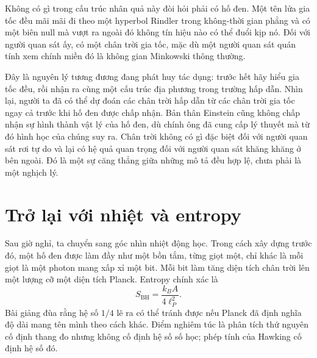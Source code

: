 Không có gì trong cấu trúc nhân quả này đòi hỏi phải có hố đen. Một tên lửa gia tốc đều mãi mãi đi theo một hyperbol Rindler trong không-thời gian phẳng và có một biên null mà vượt ra ngoài đó không tín hiệu nào có thể đuổi kịp nó. Đối với người quan sát ấy, có một chân trời gia tốc, mặc dù một người quan sát quán tính xem chính miền đó là không gian Minkowski thông thường.

\begin{classroomqa}
\end{classroomqa}

Đây là nguyên lý tương đương đang phát huy tác dụng: trước hết hãy hiểu gia tốc đều, rồi nhận ra cùng một cấu trúc địa phương trong trường hấp dẫn. Nhìn lại, người ta đã có thể dự đoán các chân trời hấp dẫn từ các chân trời gia tốc ngay cả trước khi hố đen được chấp nhận. Bản thân Einstein cũng không chấp nhận sự hình thành vật lý của hố đen, dù chính ông đã cung cấp lý thuyết mà từ đó hình học của chúng suy ra. Chân trời không có gì đặc biệt đối với người quan sát rơi tự do và lại có hệ quả quan trọng đối với người quan sát khăng khăng ở bên ngoài. Đó là một sự căng thẳng giữa những mô tả đều hợp lệ, chưa phải là một nghịch lý.

\section{Trở lại với nhiệt và entropy}

Sau giờ nghỉ, ta chuyển sang góc nhìn nhiệt động học. Trong cách xây dựng trước đó, một hố đen được làm đầy như một bồn tắm, từng giọt một, chỉ khác là mỗi giọt là một photon mang xấp xỉ một bit. Mỗi bit làm tăng diện tích chân trời lên một lượng cỡ một diện tích Planck. Entropy chính xác là
\begin{equation}
S_{\mathrm{BH}}=\frac{k_B A}{4\ell_P^2}.
\end{equation}
Bài giảng đùa rằng hệ số \(1/4\) lẽ ra có thể tránh được nếu Planck đã định nghĩa độ dài mang tên mình theo cách khác. Điểm nghiêm túc là phân tích thứ nguyên cố định thang đo nhưng không cố định hệ số số học; phép tính của Hawking cố định hệ số đó.

